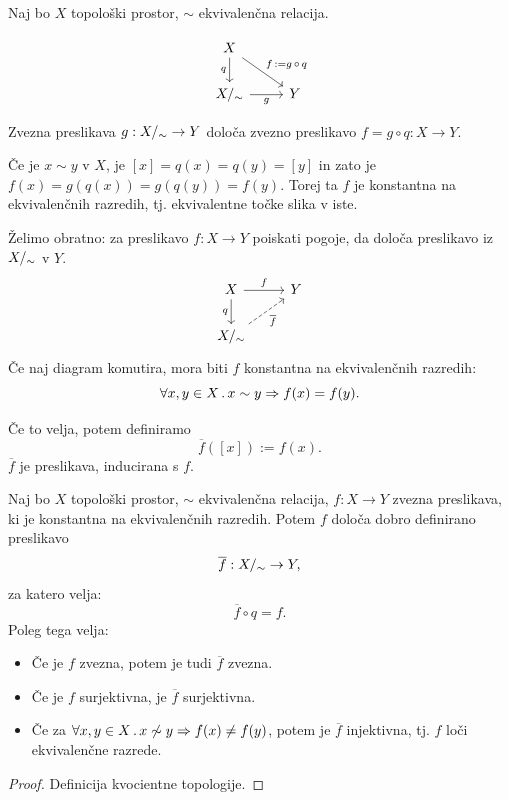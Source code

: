 Naj bo \(X\) topološki prostor, \(\sim\) ekvivalenčna relacija.

\[
    \begin{tikzcd}
        X \arrow[swap]{d}{q} \arrow{rd}{f \, := g \,  \circ \, q} &   \\%
        X/_\sim \arrow[swap]{r}{g} & Y
    \end{tikzcd}
\]

Zvezna preslikava \(g: {X/_\sim} \to Y\) določa zvezno preslikavo \(f = g \circ q: X \to Y\).

Če je \(x \sim y\) v \(X\), je \([x] = q(x) = q(y) = [y]\) in zato je \(f(x) = g(q(x)) = g(q(y)) = f(y)\). Torej ta \(f\) je konstantna na ekvivalenčnih razredih, tj. ekvivalentne točke slika v iste.

Želimo obratno: za preslikavo \(f: X \to Y\) poiskati pogoje, da določa preslikavo iz \({X/_\sim}\) v \(Y\).
%
\[
    \begin{tikzcd}
        X \arrow{r}{f} \arrow[swap]{d}{q} & Y \\
        \qs{X} \arrow[dashed, swap]{ru}{\overline{f}}
    \end{tikzcd}
\]
%
Če naj diagram komutira, mora biti \(f\) konstantna na ekvivalenčnih razredih:
\[
    \forall x,y \in X \,.\, x \sim y \Rightarrow f(x) = f(y).
\]

Če to velja, potem definiramo \[\overline{f}([x]) := f(x).\]
\(\overline{f}\) je preslikava, inducirana s \(f\).

\begin{trditev}
    Naj bo \(X\) topološki prostor, \(\sim\) ekvivalenčna relacija, \(f: X \to Y\) zvezna preslikava, ki je konstantna na ekvivalenčnih razredih. Potem \(f\) določa dobro definirano preslikavo \[\overline{f}: {X/_\sim} \to Y,\] za katero velja: \[\overline{f} \circ q = f.\]
    Poleg tega velja:
    \begin{itemize}
        \item Če je \(f\) zvezna, potem je tudi \(\overline{f}\) zvezna.
        \item Če je \(f\) surjektivna, je \(\overline{f}\) surjektivna.
        \item Če za \(\forall x, y \in X \,.\, x \not \sim y \Rightarrow f(x) \neq f(y)\), potem je \(\overline{f}\) injektivna, tj. \(f\) loči ekvivalenčne razrede.
    \end{itemize}
\end{trditev}

\begin{proof}
    Definicija kvocientne topologije.
\end{proof}

